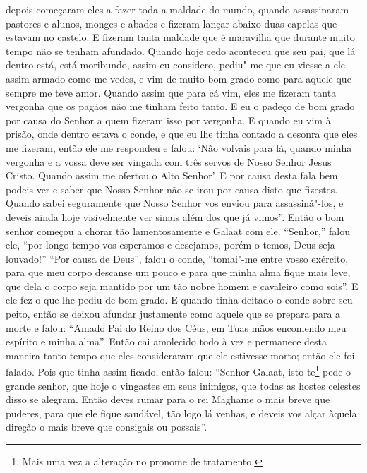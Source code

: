 depois começaram eles a fazer toda a maldade do mundo, quando assassinaram
pastores e alunos, monges e abades e fizeram lançar abaixo duas capelas que
estavam no castelo. E fizeram tanta maldade que é maravilha que durante muito
tempo não se tenham afundado. Quando hoje cedo aconteceu que seu pai, que lá
dentro está, está moribundo, assim eu considero, pediu"-me que eu viesse a ele
assim armado como me vedes, e vim de muito bom grado como para aquele que
sempre me teve amor. Quando assim que para cá vim, eles me fizeram tanta
vergonha que os pagãos não me tinham feito tanto. E eu o padeço de bom grado
por causa do Senhor a quem fizeram isso por vergonha. E quando eu vim à prisão,
onde dentro estava o conde, e que eu lhe tinha contado a desonra que eles me
fizeram, então ele me respondeu e falou: ‘Não volvais para lá, quando minha
vergonha e a vossa deve ser vingada com três servos de Nosso Senhor Jesus
Cristo. Quando assim me ofertou o Alto Senhor’. E por causa desta fala bem
podeis ver e saber que Nosso Senhor não se irou por causa disto que fizestes.
Quando sabei seguramente que Nosso Senhor vos enviou para assassiná"-los, e
deveis ainda hoje visivelmente ver sinais além dos que já vimos”. Então o bom 
senhor começou a chorar tão lamentosamente e Galaat com ele.
“Senhor,” falou ele, “por longo tempo vos esperamos e desejamos, porém o temos,
Deus seja louvado!” “Por causa de Deus”, falou o conde, “tomai"-me entre vosso
exército, para que meu corpo descanse um pouco e para que minha alma fique mais
leve, que dela o corpo seja mantido por um tão nobre homem e cavaleiro como
sois”. E ele fez o que lhe pediu de bom grado. E quando tinha deitado o conde
sobre seu peito, então se deixou afundar justamente como aquele que se prepara
para a morte e falou: “Amado Pai do Reino dos Céus, em Tuas mãos encomendo meu
espírito e minha alma”. Então cai amolecido todo à vez e permanece desta
maneira tanto tempo que eles consideraram que ele estivesse morto; então ele
foi falado. Pois que tinha assim ficado, então falou: “Senhor Galaat, isto
te\footnote{ Mais uma vez a alteração no pronome de tratamento.} 
pede o grande senhor, que hoje o vingastes em seus inimigos, que todas as
hostes celestes disso se alegram. Então deves rumar para o rei Maghame o mais
breve que puderes, para que ele fique saudável, tão logo lá venhas, e deveis
vos alçar àquela direção o mais breve que consigais ou possais”. 

